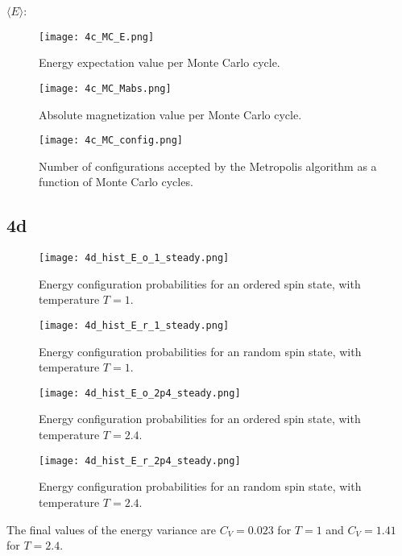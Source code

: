 \documentclass[10pt,showpacs,preprintnumbers,footinbib,amsmath,amssymb,aps,prl,twocolumn,groupedaddress,superscriptaddress,showkeys]{revtex4-1}
\begin{document}
$\langle E \rangle$:

\begin{figure}
	\centering
	\texttt{[image: 4c\_MC\_E.png]}
	\caption{Energy expectation value per Monte Carlo cycle.}
	\label{fig:4c_MC_E}
\end{figure}


\begin{figure}
	\centering
	\texttt{[image: 4c\_MC\_Mabs.png]}
	\caption{Absolute magnetization value per Monte Carlo cycle.}
	\label{fig:4c_MC_Mabs}
\end{figure}

\begin{figure}
	\centering
	\texttt{[image: 4c\_MC\_config.png]}
	\caption{Number of configurations accepted by the Metropolis algorithm as a function of Monte Carlo cycles.}
	\label{fig:4c_MC_config}
\end{figure}

\subsection*{4d}

\begin{figure}
	\centering
	\texttt{[image: 4d\_hist\_E\_o\_1\_steady.png]}
	\caption{Energy configuration probabilities for an ordered spin state, with temperature $T = 1$.}
	\label{fig:4d_E_o_1}
\end{figure}

\begin{figure}
	\centering
	\texttt{[image: 4d\_hist\_E\_r\_1\_steady.png]}
	\caption{Energy configuration probabilities for an random spin state, with temperature $T = 1$.}
	\label{fig:4d_E_r_1}
\end{figure}

\begin{figure}
	\centering
	\texttt{[image: 4d\_hist\_E\_o\_2p4\_steady.png]}
	\caption{Energy configuration probabilities for an ordered spin state, with temperature $T = 2.4$.}
	\label{fig:4d_E_o_2p4}
\end{figure}

\begin{figure}
	\centering
	\texttt{[image: 4d\_hist\_E\_r\_2p4\_steady.png]}
	\caption{Energy configuration probabilities for an random spin state, with temperature $T = 2.4$.}
	\label{fig:4d_E_r_2p4}
\end{figure}

The final values of the energy variance are $C_V = 0.023$ for $T = 1$ and $C_V = 1.41$ for $T = 2.4$.
\end{document}

